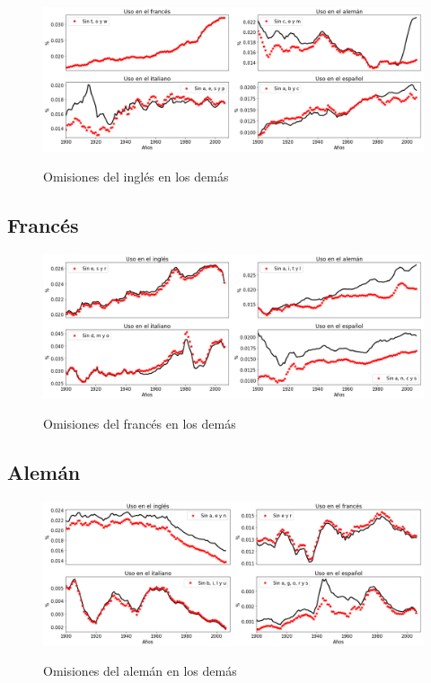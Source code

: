 \begin{figure}[h!]
	\centering
	\includegraphics[scale=.375]{Cap_5/OM_EN.png}
	\label{fig.OM_EN}
	\caption{Omisiones del inglés en los demás}
\end{figure}



\newpage
\subsection{Francés}

\begin{figure}[h!]
	\centering
	\includegraphics[scale=.375]{Cap_5/OM_FR.png}
	\label{fig.OM_FR}
	\caption{Omisiones del francés en los demás}
\end{figure}


\newpage
\subsection{Alemán}

\begin{figure}[h!]
	\centering
	\includegraphics[scale=.375]{Cap_5/OM_GE.png}
	\label{fig.OM_GE}
	\caption{Omisiones del alemán en los demás}
\end{figure}


